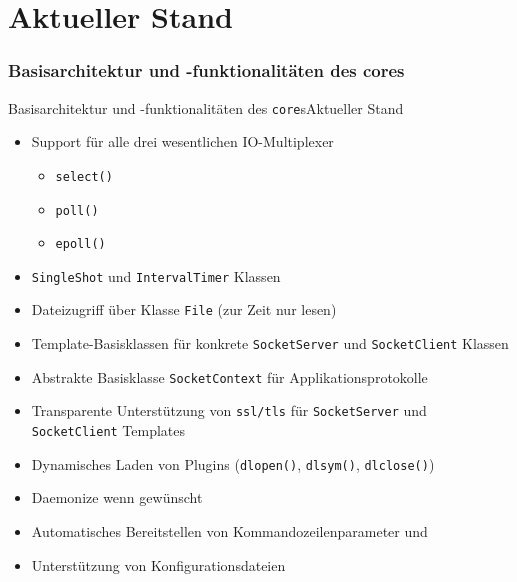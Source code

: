 ﻿\part{Aktueller Stand}
\section{Basisarchitektur und -funktionalitäten des cores}

\begin{frame}{Basisarchitektur und -funktionalitäten des \texttt{core}s}{Aktueller Stand}
  \begin{itemize}
    \item Support für alle drei wesentlichen IO-Multiplexer
    \begin{itemize}
      \item \texttt{select()}
      \item \texttt{poll()}
      \item \texttt{epoll()}
    \end{itemize}
    \item \texttt{SingleShot} und \texttt{IntervalTimer} Klassen
    \item Dateizugriff über Klasse \texttt{File} (zur Zeit nur lesen)
    \item Template-Basisklassen für konkrete \texttt{SocketServer} und \texttt{SocketClient} Klassen
    \item Abstrakte Basisklasse \texttt{SocketContext} für Applikationsprotokolle
    \item Transparente Unterstützung von \texttt{ssl/tls} für \texttt{SocketServer} und \texttt{SocketClient} Templates
    \item Dynamisches Laden von Plugins (\texttt{dlopen()}, \texttt{dlsym()}, \texttt{dlclose()})
    \item Daemonize wenn gewünscht
    \item Automatisches Bereitstellen von Kommandozeilenparameter und
    \item Unterstützung von Konfigurationsdateien
  \end{itemize}
\end{frame}
